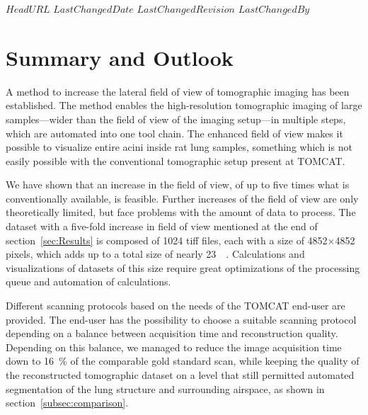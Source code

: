 \svnidlong
{$HeadURL$}
{$LastChangedDate$}
{$LastChangedRevision$}
{$LastChangedBy$}
%
\section{Summary and Outlook}
\label{summary and outlook}
A method to increase the lateral field of view of tomographic imaging has been established. The method enables the high-resolution tomographic imaging of large samples---wider than the field of view of the imaging setup---in multiple steps, which are automated into one tool chain. The enhanced field of view makes it possible to visualize entire acini inside rat lung samples, something which is not easily possible with the conventional tomographic setup present at TOMCAT.

We have shown that an increase in the field of view, of up to five times what is conventionally available, is feasible. Further increases of the field of view are only theoretically limited, but face problems with the amount of data to process. The dataset with a five-fold increase in field of view mentioned at the end of section~\ref{sec:Results} is composed of 1024 tiff files, each with a size of 4852$\times$4852 pixels, which adds up to a total size of nearly \SI{23}{\giga\byte}. Calculations and visualizations of datasets of this size require great optimizations of the processing queue and automation of calculations.

Different scanning protocols based on the needs of the TOMCAT end-user are provided. The end-user has the possibility to choose a suitable scanning protocol depending on a balance between acquisition time and reconstruction quality. Depending on this balance, we managed to reduce the image acquisition time down to \SI{16}{\percent} of the comparable gold standard scan, while keeping the quality of the reconstructed tomographic dataset on a level that still permitted automated segmentation of the lung structure and surrounding airspace, as shown in section~\ref{subsec:comparison}.